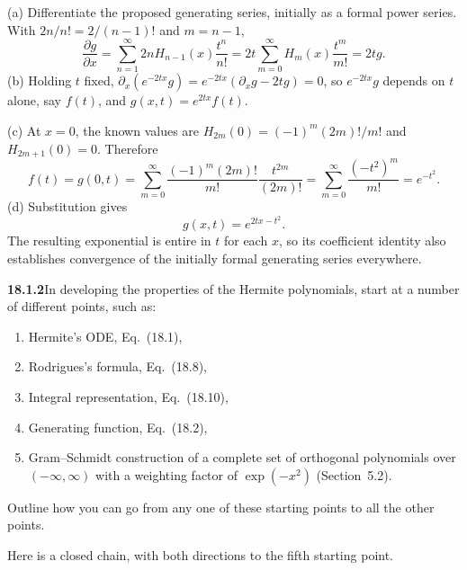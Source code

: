 (a) Differentiate the proposed generating series, initially as a
formal power series.  With $2n/n!=2/(n-1)!$ and $m=n-1$,
\[
\frac{\partial g}{\partial x}
 =\sum_{n=1}^\infty2nH_{n-1}(x)\frac{t^n}{n!}
 =2t\sum_{m=0}^\infty H_m(x)\frac{t^m}{m!}
 =\boxed{2tg}.
\]
(b) Holding $t$ fixed,
$\partial_x(e^{-2tx}g)=e^{-2tx}(\partial_xg-2tg)=0$, so $e^{-2tx}g$
depends on $t$ alone, say $f(t)$, and $g(x,t)=e^{2tx}f(t)$.

(c) At $x=0$, the known values are
$H_{2m}(0)=(-1)^m(2m)!/m!$ and $H_{2m+1}(0)=0$.  Therefore
\[
f(t)=g(0,t)=\sum_{m=0}^\infty
 \frac{(-1)^m(2m)!}{m!}\frac{t^{2m}}{(2m)!}
 =\sum_{m=0}^\infty\frac{(-t^2)^m}{m!}=e^{-t^2}.
\]
(d) Substitution gives
\[
\boxed{g(x,t)=e^{2tx-t^2}}.
\]
The resulting exponential is entire in $t$ for each $x$, so its
coefficient identity also establishes convergence of the initially
formal generating series everywhere.

\par\bigskip
\noindent\textbf{18.1.2}\quad In developing the properties of the
Hermite polynomials, start at a number of different points, such as:
\begin{enumerate}
\item[1.] Hermite's ODE, Eq.~(18.1),
\item[2.] Rodrigues's formula, Eq.~(18.8),
\item[3.] Integral representation, Eq.~(18.10),
\item[4.] Generating function, Eq.~(18.2),
\item[5.] Gram--Schmidt construction of a complete set of orthogonal
polynomials over $(-\infty,\infty)$ with a weighting factor of
$\exp(-x^{2})$ (Section~5.2).
\end{enumerate}
Outline how you can go from any one of these starting points to all
the other points.
\par\nobreak
\solution
{}
Here is a closed chain, with both directions to the fifth starting point.

